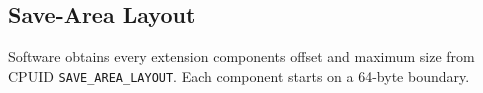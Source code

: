 \subsection{Save-Area Layout}
Software obtains every extension component\textquotesingle{}s offset and maximum size from CPUID
\texttt{SAVE\_AREA\_LAYOUT}. Each component starts on a 64-byte boundary.



